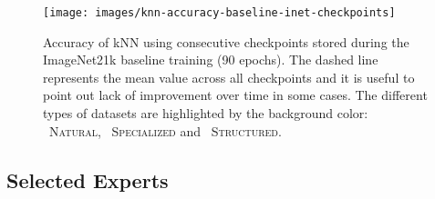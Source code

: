 \documentclass{article}
\newcommand{\naturalsym}{{\protect\scalebox{1.5}{\color{naturalcolor!50}}}}
\newcommand{\specializedsym}{{\protect\scalebox{1.5}{\color{specializedcolor!50}}}}
\newcommand{\structuredsym}{{\protect\scalebox{1.5}{\color{structuredcolor!50}}}}
\begin{document}
\begin{figure}[htb]
\centering
\texttt{[image: images/knn-accuracy-baseline-inet-checkpoints]}
\caption{
Accuracy of kNN using consecutive checkpoints stored during the ImageNet21k baseline 
training (90 epochs). The dashed line represents
the mean value across all checkpoints and it 
is useful to point out lack of improvement over 
time in some cases. The different types of 
datasets are highlighted by the background color:
{\naturalsym~\textsc{Natural}},
{\specializedsym~\textsc{Specialized}} and
{\structuredsym~\textsc{Structured}}.
\label{fig:app_inet_knn_ckpts}}
\end{figure}


\subsection{Selected Experts}
\label{app:selected_experts}
\end{document}
